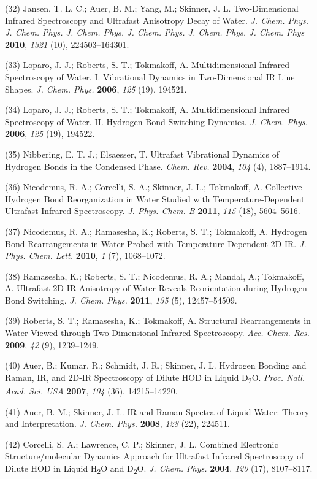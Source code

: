 \documentclass[]{article}
\begin{document}
(32) Jansen, T. L. C.; Auer, B. M.; Yang, M.; Skinner, J. L.
Two-Dimensional Infrared Spectroscopy and Ultrafast Anisotropy Decay of
Water. \emph{J. Chem. Phys. J. Chem. Phys. J. Chem. Phys. J. Chem. Phys.
J. Chem. Phys. J. Chem. Phys} \textbf{2010}, \emph{1321} (10),
224503--164301.

(33) Loparo, J. J.; Roberts, S. T.; Tokmakoff, A. Multidimensional
Infrared Spectroscopy of Water. I. Vibrational Dynamics in
Two-Dimensional IR Line Shapes. \emph{J. Chem. Phys.} \textbf{2006},
\emph{125} (19), 194521.

(34) Loparo, J. J.; Roberts, S. T.; Tokmakoff, A. Multidimensional
Infrared Spectroscopy of Water. II. Hydrogen Bond Switching Dynamics.
\emph{J. Chem. Phys.} \textbf{2006}, \emph{125} (19), 194522.

(35) Nibbering, E. T. J.; Elsaesser, T. Ultrafast Vibrational Dynamics
of Hydrogen Bonds in the Condensed Phase. \emph{Chem. Rev.}
\textbf{2004}, \emph{104} (4), 1887--1914.

(36) Nicodemus, R. A.; Corcelli, S. A.; Skinner, J. L.; Tokmakoff, A.
Collective Hydrogen Bond Reorganization in Water Studied with
Temperature-Dependent Ultrafast Infrared Spectroscopy. \emph{J. Phys.
Chem. B} \textbf{2011}, \emph{115} (18), 5604--5616.

(37) Nicodemus, R. A.; Ramasesha, K.; Roberts, S. T.; Tokmakoff, A.
Hydrogen Bond Rearrangements in Water Probed with Temperature-Dependent
2D IR. \emph{J. Phys. Chem. Lett.} \textbf{2010}, \emph{1} (7),
1068--1072.

(38) Ramasesha, K.; Roberts, S. T.; Nicodemus, R. A.; Mandal, A.;
Tokmakoff, A. Ultrafast 2D IR Anisotropy of Water Reveals Reorientation
during Hydrogen-Bond Switching. \emph{J. Chem. Phys.} \textbf{2011},
\emph{135} (5), 12457--54509.

(39) Roberts, S. T.; Ramasesha, K.; Tokmakoff, A. Structural
Rearrangements in Water Viewed through Two-Dimensional Infrared
Spectroscopy. \emph{Acc. Chem. Res.} \textbf{2009}, \emph{42} (9),
1239--1249.

(40) Auer, B.; Kumar, R.; Schmidt, J. R.; Skinner, J. L. Hydrogen
Bonding and Raman, IR, and 2D-IR Spectroscopy of Dilute HOD in Liquid
D\textsubscript{2}O. \emph{Proc. Natl. Acad. Sci. USA} \textbf{2007},
\emph{104} (36), 14215--14220.

(41) Auer, B. M.; Skinner, J. L. IR and Raman Spectra of Liquid Water:
Theory and Interpretation. \emph{J. Chem. Phys.} \textbf{2008},
\emph{128} (22), 224511.

(42) Corcelli, S. A.; Lawrence, C. P.; Skinner, J. L. Combined
Electronic Structure/molecular Dynamics Approach for Ultrafast Infrared
Spectroscopy of Dilute HOD in Liquid H\textsubscript{2}O and
D\textsubscript{2}O. \emph{J. Chem. Phys.} \textbf{2004}, \emph{120}
(17), 8107--8117.
\end{document}
